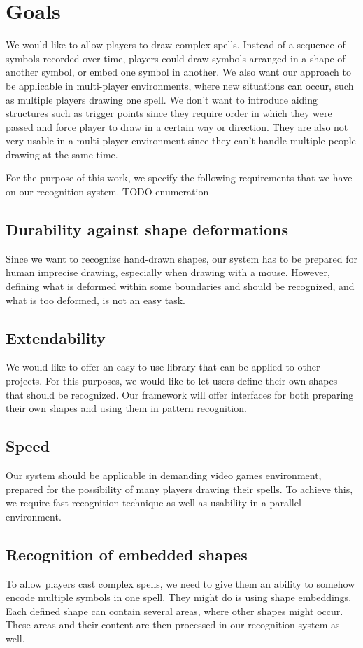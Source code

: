 \section{Goals}

We would like to allow players to draw complex spells. Instead of a sequence of symbols recorded over time, players could draw symbols arranged in a shape of another symbol, or embed one symbol in another. We also want our approach to be applicable in multi-player environments, where new situations can occur, such as multiple players drawing one spell. We don't want to introduce aiding structures such as trigger points since they require order in which they were passed and force player to draw in a certain way or direction. They are also not very usable in a multi-player environment since they can't handle multiple people drawing at the same time.

For the purpose of this work, we specify the following requirements that we have on our recognition system.
TODO enumeration 

\subsection{Durability against shape deformations}
Since we want to recognize hand-drawn shapes, our system has to be prepared for human imprecise drawing, especially when drawing with a mouse. However, defining what is deformed within some boundaries and should be recognized, and what is too deformed, is not an easy task.

\subsection{Extendability}
We would like to offer an easy-to-use library that can be applied to other projects. For this purposes, we would like to let users define their own shapes that should be recognized. Our framework will offer interfaces for both preparing their own shapes and using them in pattern recognition.

\subsection{Speed}
Our system should be applicable in demanding video games environment, prepared for the possibility of many players drawing their spells. To achieve this, we require fast recognition technique as well as usability in a parallel environment. 

\subsection{Recognition of embedded shapes}
To allow players cast complex spells, we need to give them an ability to somehow encode multiple symbols in one spell. They might do is using shape embeddings. Each defined shape can contain several areas, where other shapes might occur. These areas and their content are then processed in our recognition system as well.

